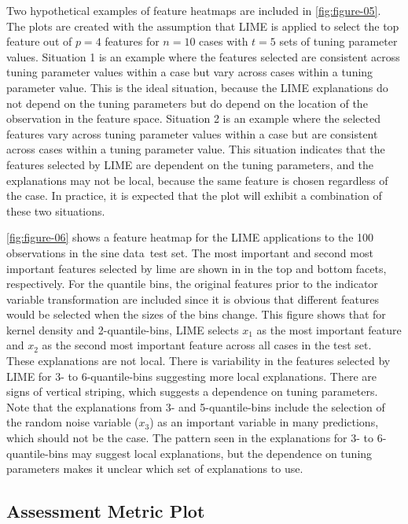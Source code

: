 \documentclass[AMS,STIX2COL]{WileyNJD-v2}\usepackage[]{graphicx}\usepackage[]{color}
\newcommand{\data}{sine data}
\begin{document}
Two hypothetical examples of feature heatmaps are included in \autoref{fig:figure-05}. The plots are created with the assumption that LIME is applied to select the top feature out of $p=4$  features for $n=10$ cases with $t=5$ sets of tuning parameter values. Situation 1 is  an example where the features selected are consistent across tuning parameter values within a case but vary across cases within a tuning parameter value. This is the ideal situation, because the LIME explanations do not depend on the tuning parameters but do depend on the location of the observation in the feature space. Situation 2 is an example where the selected features vary across tuning parameter values within a case but are consistent across cases within a tuning parameter value. This situation indicates that the features selected by LIME are dependent on the tuning parameters, and the explanations may not be  local, because the same feature is chosen regardless of the case. In practice, it is expected that the plot will exhibit a combination of these two situations.

\autoref{fig:figure-06} shows a feature heatmap for the LIME applications to the 100 observations in the \data \ test set. The most important and second most important features selected by lime are shown in in the top and bottom facets, respectively. For the quantile bins, the original features prior to the indicator variable transformation are included since it is obvious that different features would be selected when the sizes of the bins change. This figure shows that for kernel density and 2-quantile-bins, LIME selects $x_1$ as the most important feature and $x_2$ as the second most important feature across all cases in the test set. These explanations are not local. There is variability in the features selected by LIME for 3- to 6-quantile-bins suggesting more local explanations. There are signs of vertical striping, which suggests a dependence on tuning parameters. Note that the explanations from 3- and 5-quantile-bins include the selection of the random noise variable ($x_3$) as an important variable in many predictions, which should not be the case. The pattern seen in the explanations for 3- to 6-quantile-bins may suggest local explanations, but the dependence on tuning parameters makes it unclear which set of explanations to use.

\subsection{Assessment Metric Plot} \label{assess-metric}
\end{document}
